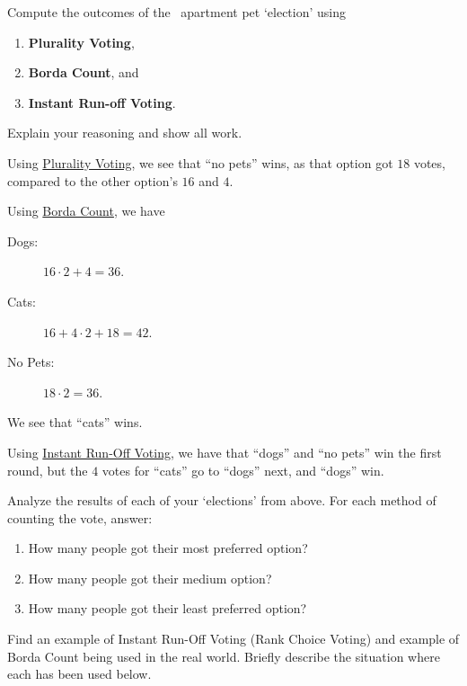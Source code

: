 \documentclass[nooutcomes,noauthor,hints,handout]{ximera}
\begin{document}
\mynewpage




\begin{question}
  Compute the outcomes of the \mooculus~apartment pet `election'
  using
  \begin{enumerate}
  \item \textbf{Plurality Voting},
  \item \textbf{Borda Count}, and
  \item \textbf{Instant Run-off Voting}.
  \end{enumerate}
  Explain your reasoning and show all work.
  \begin{freeResponse}
    Using \underline{Plurality Voting}, we see that ``no pets'' wins, as that
    option got $18$ votes, compared to the other option's $16$ and
    $4$.


    
    Using \underline{Borda Count}, we have
    \begin{description}
      \item[Dogs:] $16\cdot 2 + 4 = 36$.
      \item[Cats:] $16 +4\cdot 2+18 =42$.
      \item[No Pets:] $18\cdot 2 = 36$.
    \end{description}
  
  We see that ``cats'' wins.

  

  Using \underline{Instant Run-Off Voting}, we have that ``dogs'' and
  ``no pets'' win the first round, but the $4$ votes for ``cats'' go
  to ``dogs'' next, and ``dogs'' win.
  \end{freeResponse}
\end{question}
\mynewpage



\begin{question}
  Analyze the results of each of your `elections' from above. For each
  method of counting the vote, answer:
  \begin{enumerate}
  \item How many people got their most preferred option?
  \item How many people got their medium option? 
  \item How many people got their least preferred option?
  \end{enumerate}
\end{question}
\mynewpage








\begin{question}
  Find an example of Instant Run-Off Voting (Rank Choice Voting) and
  example of Borda Count being used in the real world. Briefly
  describe the situation where each has been used below.
    
\end{question}
\end{document}
